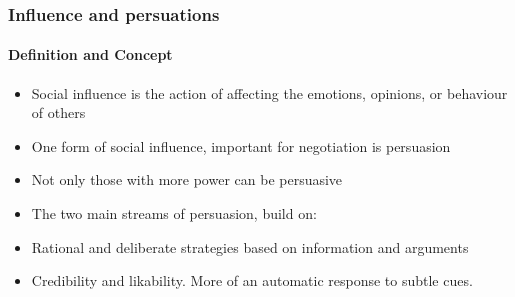 \subsubsection{Influence and persuations}

\paragraph{Definition and Concept}

\begin{itemize}
    \item Social influence is the action of affecting the emotions, opinions,
        or behaviour of others
    \item One form of social influence, important for negotiation is persuasion
    \item Not only those with more power can be persuasive
    \item The two main streams of persuasion, build on:
        \item Rational and deliberate strategies based on information and
            arguments
        \item Credibility and likability. More of an automatic response to
            subtle cues.
\end{itemize}


